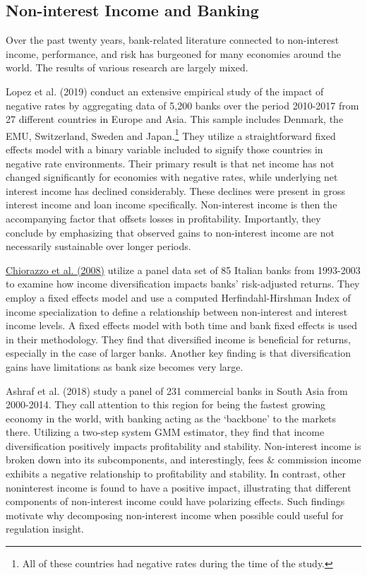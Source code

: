 \documentclass[10pt]{article} %
\begin{document}
\subsection{Non-interest Income and Banking}
Over the past twenty years, bank-related literature connected to non-interest income, performance, and risk has burgeoned for many economies around the world. The results of various research are largely mixed. 

Lopez et al. (2019) conduct an extensive empirical study of the impact of negative rates by aggregating data of 5,200 banks over the period 2010-2017 from 27 different countries in Europe and Asia. This sample includes Denmark, the EMU, Switzerland, Sweden and Japan.\footnote{All of these countries had negative rates during the time of the study.} They utilize a straightforward fixed effects model with a binary variable included to signify those countries in negative rate environments. Their primary result is that net income has not changed significantly for economies with negative rates, while underlying net interest income has declined considerably. These declines were present in gross interest income and loan income specifically. Non-interest income is then the accompanying factor that offsets losses in profitability. Importantly, they conclude by emphasizing that observed gains to non-interest income are not necessarily sustainable over longer periods.    

\hyperlink{Chiorazzo}{Chiorazzo et al. (2008)} utilize a panel data set of 85 Italian banks from 1993-2003 to examine how income diversification impacts banks' risk-adjusted returns. They employ a fixed effects model and use a computed Herfindahl-Hirshman Index of income specialization to define a relationship between non-interest and interest income levels. A fixed effects model with both time and bank fixed effects is used in their methodology. They find that diversified income is beneficial for returns, especially in the case of larger banks. Another key finding is that diversification gains have limitations as bank size becomes very large.

Ashraf et al. (2018) study a panel of 231 commercial banks in South Asia from 2000-2014. They call attention to this region for being the fastest growing economy in the world, with banking acting as the `backbone' to the markets there.  Utilizing a two-step system GMM estimator, they find that income diversification positively impacts profitability and stability. Non-interest income is broken down into its subcomponents, and interestingly, fees \& commission income exhibits a negative relationship to profitability and stability. In contrast, other noninterest income is found to have a positive impact, illustrating that different components of non-interest income could have polarizing effects. Such findings motivate why decomposing non-interest income when possible could useful for regulation insight.  
\end{document}
